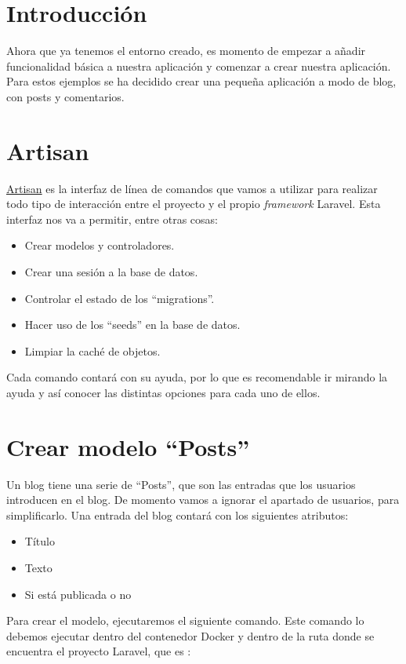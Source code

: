 \chapter{Introducción}

Ahora que ya tenemos el entorno creado, es momento de empezar a añadir funcionalidad básica a nuestra aplicación y comenzar a crear nuestra aplicación. Para estos ejemplos se ha decidido crear una pequeña aplicación a modo de blog, con posts y comentarios.

\chapter{Artisan}
\href{https://laravel.com/docs/10.x/artisan}{Artisan} es la interfaz de línea de comandos que vamos a utilizar para realizar todo tipo de interacción entre el proyecto y el propio \textit{framework} Laravel. Esta interfaz nos va a permitir, entre otras cosas:

\begin{itemize}
    \item Crear modelos y controladores.
    \item Crear una sesión a la base de datos.
    \item Controlar el estado de los “migrations”.
    \item Hacer uso de los “seeds” en la base de datos.
    \item Limpiar la caché de objetos.
\end{itemize}

Cada comando contará con su ayuda, por lo que es recomendable ir mirando la ayuda y así conocer las distintas opciones para cada uno de ellos.


\chapter{Crear modelo “Posts”}
Un blog tiene una serie de “Posts”, que son las entradas que los usuarios introducen en el blog. De momento vamos a ignorar el apartado de usuarios, para simplificarlo. Una entrada del blog contará con los siguientes atributos:

\begin{itemize}
    \item Título
    \item Texto
    \item Si está publicada o no
\end{itemize}

Para crear el modelo, ejecutaremos el siguiente comando. Este comando lo debemos ejecutar dentro del contenedor Docker y dentro de la ruta donde se encuentra el proyecto Laravel, que es :

